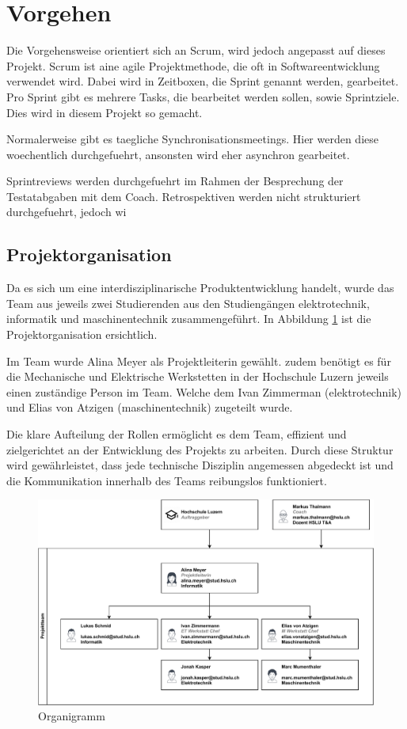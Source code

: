 \section{Vorgehen}

Die Vorgehensweise orientiert sich an Scrum, wird jedoch angepasst auf dieses Projekt.
Scrum ist aine agile Projektmethode, die oft in Softwareentwicklung verwendet wird. Dabei wird in Zeitboxen, die Sprint genannt werden, gearbeitet. Pro Sprint gibt es mehrere Tasks, die bearbeitet werden sollen, sowie Sprintziele. Dies wird in diesem Projekt so gemacht.

Normalerweise gibt es taegliche Synchronisationsmeetings. Hier werden diese woechentlich durchgefuehrt, ansonsten wird eher asynchron gearbeitet.

Sprintreviews werden durchgefuehrt im Rahmen der Besprechung der Testatabgaben mit dem Coach. Retrospektiven werden nicht strukturiert durchgefuehrt, jedoch wi

\subsection{Projektorganisation}

Da es sich um eine interdisziplinarische Produktentwicklung handelt, wurde das Team aus jeweils zwei Studierenden aus den Studiengängen \acrfull{elektrotechnik}, \acrfull{informatik} und \acrfull{maschinentechnik} zusammengeführt. In Abbildung \ref{fig:Organigramm} ist die Projektorganisation ersichtlich. 

Im Team wurde Alina Meyer als Projektleiterin gewählt. zudem benötigt es für die Mechanische und Elektrische Werkstetten in der Hochschule Luzern jeweils einen zuständige Person im Team. Welche dem Ivan Zimmerman (\acrshort{elektrotechnik}) und Elias von Atzigen (\acrshort{maschinentechnik}) zugeteilt wurde.

Die klare Aufteilung der Rollen ermöglicht es dem Team, effizient und zielgerichtet an der Entwicklung des Projekts zu arbeiten. Durch diese Struktur wird gewährleistet, dass jede technische Disziplin angemessen abgedeckt ist und die Kommunikation innerhalb des Teams reibungslos funktioniert.

\begin{figure}[h]
\centering
\includegraphics[width=\textwidth]{img/Projektorganisation.pdf}
\caption{Organigramm}
\label{fig:Organigramm}
\end{figure}

